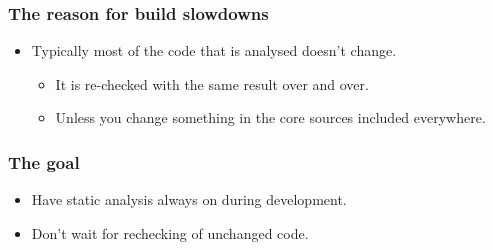 \documentclass[compress,table,xcolor=table]{beamer}
\begin{document}
\begin{frame}
  \frametitle{The reason for build slowdowns}
    \LARGE
    \begin{itemize}
    \item Typically most of the code that is analysed doesn't change.
        \begin{itemize}
        \Large
        \item It is re-checked with the same result over and over.
        \item Unless you change something in the core sources included
            everywhere.
        \end{itemize}
    \end{itemize}
\end{frame}
\begin{frame}
  \frametitle{The goal}
    \LARGE
    \begin{itemize}
    \item Have static analysis always on during development.
    \item Don't wait for rechecking of unchanged code.
    \end{itemize}
\end{frame}
\end{document}
